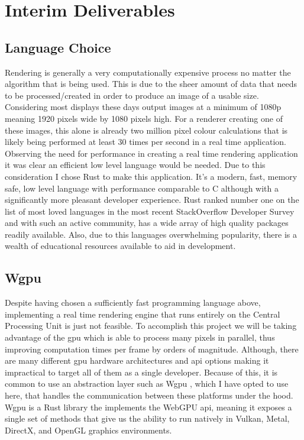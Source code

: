 \documentclass[titlepage]{article}
\begin{document}
\section{Interim Deliverables}
\subsection{Language Choice}
Rendering is generally a very computationally expensive process no matter the algorithm that is being used. This is due to the sheer amount of data that needs to be processed/created in order to produce an image of a usable size. Considering most displays these days output images at a minimum of 1080p meaning 1920 pixels wide by 1080 pixels high. For a renderer creating one of these images, this alone is already two million pixel colour calculations that is likely being performed at least 30 times per second in a real time application. Observing the need for performance in creating a real time rendering application it was clear an efficient low level language would be needed. Due to this consideration I chose Rust to make this application. It's a modern, fast, memory safe, low level language with performance comparable to C although with a significantly more pleasant developer experience. Rust ranked number one on the list of most loved languages in the most recent StackOverflow Developer Survey \cite{survey} and with such an active community, has a wide array of high quality packages readily available. Also, due to this languages overwhelming popularity, there is a wealth of educational resources available to aid in development.

\subsection{Wgpu}
Despite having chosen a sufficiently fast programming language above, implementing a real time rendering engine that runs entirely on the Central Processing Unit is just not feasible. To accomplish this project we will be taking advantage of the \acrfull{gpu} which is able to process many pixels in parallel, thus improving computation times per frame by orders of magnitude. Although, there are many different \acrshort{gpu} hardware architectures and \acrfull{api} options making it impractical to target all of them as a single developer. Because of this, it is common to use an abstraction layer such as Wgpu \cite{wgpu:source}, which I have opted to use here, that handles the communication between these platforms under the hood. Wgpu is a Rust library the implements the WebGPU \cite{webgpu} \acrshort{api}, meaning it exposes a single set of methods that give us the ability to run natively in Vulkan, Metal, DirectX, and OpenGL graphics environments.
\end{document}
